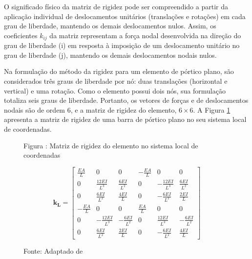 O significado físico da matriz de rigidez pode ser compreendido a partir da aplicação individual de deslocamentos unitários (translações e rotações) em cada grau de liberdade, mantendo os demais deslocamentos nulos. Assim, os coeficientes $k_{ij}$ da matriz representam a força nodal desenvolvida na direção do grau de liberdade (i) em resposta à imposição de um deslocamento unitário no grau de liberdade (j), mantendo os demais deslocamentos nodais nulos.

Na formulação do método da rigidez para um elemento de pórtico plano, são considerados três graus de liberdade por nó: duas translações (horizontal e vertical) e uma rotação. Como o elemento possui dois nós, sua formulação totaliza seis graus de liberdade. Portanto, os vetores de forças e de deslocamentos nodais são de ordem 6, e a matriz de rigidez do elemento, $6 \times 6$. A Figura \ref{Fig.4.4} apresenta a matriz de rigidez de uma barra de pórtico plano no seu sistema local de coordenadas.

\begin{figure}[H]
    \centering
    \label{Fig.4.4}

    \begin{minipage}{10cm}
        \fontsize{10pt}{12pt}\selectfont
        Figura \thefigure: Matriz de rigidez do elemento no sistema local de coordenadas
    \end{minipage}

    \vspace{0.05cm}

    \[
        \mathbf{k_{L}} = \begin{bmatrix}
            \frac{EA}{L} & 0 & 0 & -\frac{EA}{L} & 0 & 0 \\
            0 & \frac{12EI}{L^3} & \frac{6EI}{L^2} & 0 & -\frac{12EI}{L^3} & \frac{6EI}{L^2} \\
            0 & \frac{6EI}{L^2} & \frac{4EI}{L} & 0 & -\frac{6EI}{L^2} & \frac{2EI}{L} \\
            -\frac{EA}{L} & 0 & 0 & \frac{EA}{L} & 0 & 0 \\
            0 & -\frac{12EI}{L^3} & -\frac{6EI}{L^2} & 0 & \frac{12EI}{L^3} & -\frac{6EI}{L^2} \\
            0 & \frac{6EI}{L^2} & \frac{2EI}{L} & 0 & -\frac{6EI}{L^2} & \frac{4EI}{L}
        \end{bmatrix}
    \]

    \vspace{0.3cm}
    
    \begin{minipage}{10cm}
        \fontsize{10pt}{12pt}\selectfont
        Fonte: Adaptado de 
    \end{minipage}
\end{figure}

